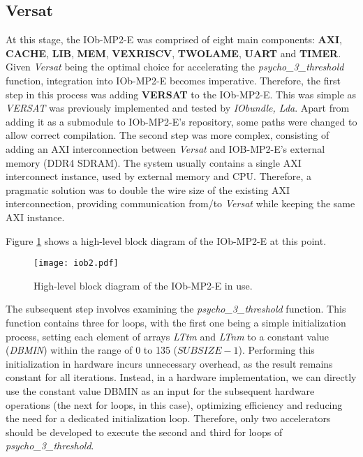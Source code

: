 \subsection{Versat}
At this stage, the IOb-MP2-E was comprised of eight main components: \textbf{AXI}, \textbf{CACHE}, \textbf{LIB}, \textbf{MEM}, \textbf{VEXRISCV}, \textbf{TWOLAME}, \textbf{UART} and \textbf{TIMER}. Given \textit{Versat} being the optimal choice for accelerating the \textit{psycho\_3\_threshold} function, integration into IOb-MP2-E becomes imperative.
Therefore, the first step in this process was adding \textbf{VERSAT} to the IOb-MP2-E. This was simple as \textit{VERSAT} was previously implemented and tested by \textit{IObundle, Lda}. Apart from adding it as a submodule to IOb-MP2-E's repository, some paths were changed to allow correct compilation.
The second step was more complex, consisting of adding an AXI interconnection between \textit{Versat} and IOB-MP2-E's external memory (DDR4 SDRAM). The system usually contains a single AXI~\cite{bib:axi_xilinx} interconnect instance, used by external memory and CPU. Therefore, a pragmatic solution was to double the wire size of the existing AXI interconnection, providing communication from/to \textit{Versat} while keeping the same AXI instance.

Figure \ref{fig:newiob2} shows a high-level block diagram of the IOb-MP2-E at this point.

\vspace{0.1cm}

\begin{figure}[H]
\centerline{\texttt{[image: iob2.pdf]}}
\caption{High-level block diagram of the IOb-MP2-E in use.}
\label{fig:newiob2}
\end{figure}

The subsequent step involves examining the \textit{psycho\_3\_threshold} function.
This function contains three for loops, with the first one being a simple initialization process, setting each element of arrays \textit{LTtm} and \textit{LTnm} to a constant value (\textit{DBMIN}) within the range of 0 to 135 ($SUBSIZE-1$). Performing this initialization in hardware incurs unnecessary overhead, as the result remains constant for all iterations. Instead, in a hardware implementation, we can directly use the constant value DBMIN as an input for the subsequent hardware operations (the next for loops, in this case), optimizing efficiency and reducing the need for a dedicated initialization loop.
Therefore, only two accelerators should be developed to execute the second and third for loops of \textit{psycho\_3\_threshold}.

